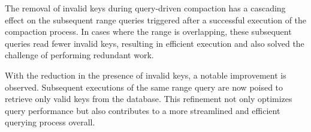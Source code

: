 The removal of invalid keys during query-driven compaction has a cascading effect on the subsequent range queries 
triggered after a successful execution of the compaction process. In cases where the range is overlapping, these 
subsequent queries read fewer invalid keys, resulting in efficient execution and also solved the challenge 
of performing redundant work.

With the reduction in the presence of invalid keys, a notable improvement is observed. Subsequent executions of the 
same range query are now poised to retrieve only valid keys from the database. This refinement not only optimizes 
query performance but also contributes to a more streamlined and efficient querying process overall.
